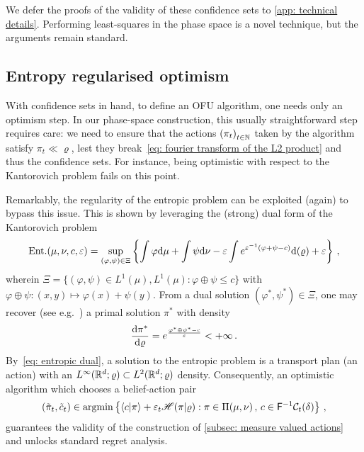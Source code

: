 We defer the proofs of the validity of these confidence sets to \cref{app: technical details}. Performing least-squares in the phase space is a novel technique, but the arguments remain standard. 


\subsection{Entropy regularised optimism}\label{subsec: entropy regularised optimism}

With confidence sets in hand, to define an OFU algorithm, one needs only an optimism step. In our phase-space construction, this usually straightforward step requires care: we need to ensure that the actions ${(\pi_t)}_{t\in\mathbb{N}}$ taken by the algorithm satisfy $\pi_t\ll\varrho$, lest they break~\eqref{eq: fourier transform of the L2 product} and thus the confidence sets. For instance, being optimistic with respect to the Kantorovich problem fails on this point.

Remarkably, the regularity of the entropic problem can be exploited (again) to bypass this issue. This is shown by leveraging the (strong) dual form of the Kantorovich problem
\begin{align}
    \text{Ent.}(\mu,\nu,c,\varepsilon) = \sup_{(\varphi,\psi)\in\Xi} \left\{\int \varphi\mathrm{d}\mu + \int \psi\mathrm{d}\nu - \varepsilon\int e^{\varepsilon^{-1}(\varphi+\psi-c)}\mathrm{d}(\varrho) + \varepsilon\right\}\,,\label{eq: entropic dual}
\end{align}
wherein $\Xi=\{(\varphi,\psi)\in L^1(\mu), L^1(\mu) :\varphi\oplus\psi\le c \}$ with  $\varphi\oplus\psi:(x,y)\mapsto \varphi(x)+\psi(y)$. From a dual solution $(\varphi^*,\psi^*)\in\Xi$, one may recover (see e.g.\ \citet[Thm.~4.2]{nutz_introduction_2022}) a primal solution $\pi^*$ with density 
\[ 
    \frac{\mathrm{d}\pi^*}{\mathrm{d}\varrho}=e^{\frac{\varphi^*\oplus\psi^*-c}{\varepsilon}}<+\infty\,.
\]  
By~\eqref{eq: entropic dual}, a solution to the entropic problem is a transport plan (an action) with an $L^\infty(\mathbb{R}^d;\varrho)\subset L^2(\mathbb{R}^d;\varrho)$ density. Consequently, an optimistic algorithm which chooses a belief-action pair
\begin{align}
    (\tilde\pi_t,\tilde c_t)\in\operatorname*{argmin}\left\{  \langle c\vert\pi\rangle +\varepsilon_t\mathscr{H}(\pi\vert\varrho): \pi\in\Pi(\mu,\nu)\,,\, c\in\mathsf{F}^{-1}\mathcal{C}_t(\delta)\right\}\,,\label{eq: optimistic planning}
\end{align}
guarantees the validity of the construction of \cref{subsec: measure valued actions} and unlocks standard regret analysis. 


